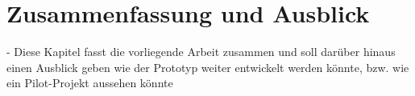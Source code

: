 \chapter{Zusammenfassung und Ausblick}

- Diese Kapitel fasst die vorliegende Arbeit zusammen und soll darüber hinaus einen Ausblick geben wie der Prototyp weiter entwickelt werden könnte, bzw. wie ein Pilot-Projekt aussehen könnte
